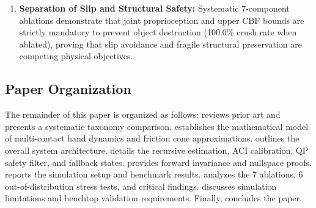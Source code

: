 \begin{enumerate}
    \item \textbf{Separation of Slip and Structural Safety:} Systematic 7-component ablations demonstrate that joint proprioception and upper CBF bounds are strictly mandatory to prevent object destruction (100.0\% crush rate when ablated), proving that slip avoidance and fragile structural preservation are competing physical objectives.
\end{enumerate}

\subsection{Paper Organization}
The remainder of this paper is organized as follows:  reviews prior art and presents a systematic taxonomy comparison.  establishes the mathematical model of multi-contact hand dynamics and friction cone approximations.  outlines the overall system architecture.  details the recursive estimation, ACI calibration, QP safety filter, and fallback states.  provides forward invariance and nullspace proofs.  reports the simulation setup and benchmark results.  analyzes the 7 ablations, 6 out-of-distribution stress tests, and critical findings.  discusses simulation limitations and benchtop validation requirements. Finally,  concludes the paper.
